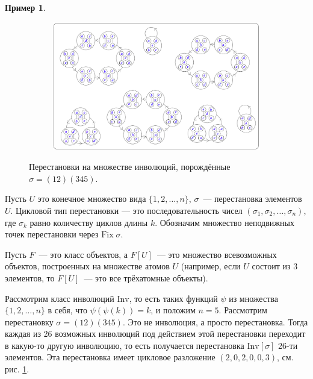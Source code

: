 \documentclass{article}
\theoremstyle{definition}
\newtheorem{example}{Пример}
\begin{document}
\begin{example}
    \begin{figure}[h]
    \centering
    \begin{subfigure}{.8\textwidth}
    	\centering
    	\includegraphics[width=\textwidth]{involutions.png}
    \end{subfigure}%
    \caption{Перестановки на множестве инволюций, порождённые \( \sigma =
(12)(345) \).}
    \label{fig:involutions}	
    \end{figure}
	Пусть \( U \) это конечное множество вида \( \{ 1, 2, \ldots, n \} \), \( 
	\sigma \)~--- перестановка элементов \( U \). Цикловой тип перестановки --- 
	это последовательность чисел \( (\sigma_1, \sigma_2, \ldots, \sigma_n) \), 
	где \( \sigma_k \) равно количеству циклов длины \( k \). Обозначим 
	множество неподвижных точек перестановки через \( \mathrm{Fix}\; \sigma \).
	
	Пусть \( F \)~--- это класс объектов, а \( F[U] \)~--- это множество 
	всевозможных объектов, построенных на множестве атомов \( U \) (например,
    если \( U \) состоит из \( 3 \) элементов, то \( F[U] \)~--- это все трёхатомные
    объекты).
	
	Рассмотрим класс инволюций \( \mathrm{Inv} \), то есть таких функций \( 
	\psi \) из множества \( \{ 1, 2, \ldots, n \} \) в себя, что \( 
	\psi(\psi(k)) = k \), и положим \( n = 5 \). Рассмотрим перестановку \( 
	\sigma = (12)(345) \). Это не инволюция, а просто перестановка.
    Тогда каждая из 26 возможных инволюций под действием 
	этой перестановки переходит в какую-то другую инволюцию, то есть получается 
	перестановка \( \mathrm{Inv}[\sigma] \) 26-ти элементов. Эта перестановка 
	имеет цикловое разложение \( (2,0,2,0,0,3) \), см. рис.
\ref{fig:involutions}.

\end{example}
\end{document}
